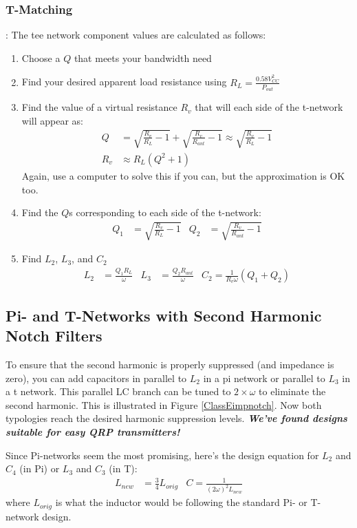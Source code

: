 \documentclass[10pt,letterpaper]{article}
\begin{document}
\subsubsection{T-Matching}: The tee network component values are calculated as follows:
\begin{enumerate}
\item Choose a $Q$ that meets your bandwidth need
\item Find your desired apparent load resistance using $R_L=\frac{0.58 V_{CC}^2}{P_{out}}$
\item Find the value of a virtual resistance $R_v$ that will each side of the t-network will appear as:
\begin{align*}
Q&=\sqrt{\frac{R_v}{R_L}-1}+\sqrt{\frac{R_v}{R_{ant}}-1}\approx \sqrt{\frac{R_v}{R_L}-1}\\
R_v&\approx R_L(Q^2+1)
\end{align*}
Again, use a computer to solve this if you can, but the approximation is OK too.
\item Find the $Q$s corresponding to each side of the t-network:
\begin{align*}
Q_1 & = \sqrt{\frac{R_v}{R_L}-1} &Q_2 &=\sqrt{\frac{R_v}{R_{ant}}-1}
\end{align*}
\item Find $L_2$,  $L_3$, and $C_2$
\begin{align*}
L_2 &= \frac{Q_1R_L}{\omega} &L_3 &= \frac{Q_2R_{ant}}{\omega} & C_2 = \frac{1}{R_v\omega}(Q_1+Q_2)
\end{align*}
\end{enumerate}



\subsection{Pi- and T-Networks with Second Harmonic Notch Filters}

To ensure that the second harmonic is properly suppressed (and impedance is zero), you can add capacitors in parallel to $L_2$ in a pi network or parallel to $L_3$ in a t network. This parallel LC branch can be tuned to $2\times \omega$ to eliminate the second harmonic. This is illustrated in Figure \ref{ClassEimpnotch}. Now both typologies reach the desired harmonic suppression levels. \textbf{\textit{We've found designs suitable for easy QRP transmitters!}}

Since Pi-networks seem the most promising, here's the design equation for $L_2$ and $C_4$ (in Pi) or $L_3$ and $C_3$ (in T):
\begin{align*}
L_{new}&=\frac{3}{4}L_{orig} &
C=\frac{1}{(2\omega)^2L_{new}}
\end{align*}
where $L_{orig}$ is what the inductor would be following the standard Pi- or T-network design.
\end{document}
